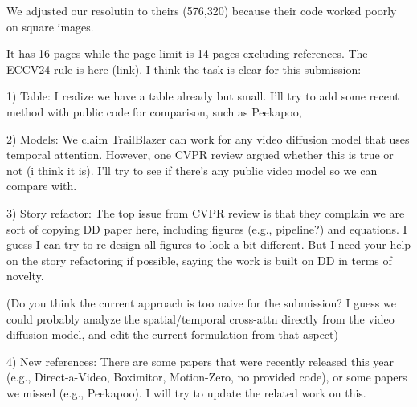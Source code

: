 We adjusted our resolutin to theirs (576,320) because their code worked poorly on square images.


It has 16 pages while the page limit is 14 pages excluding references. The ECCV24 rule is here (link). I think the task is clear for this submission:

1) Table:
I realize we have a table already but small. I'll try to add some recent method with public code for comparison, such as Peekapoo, 
 
2) Models: 
We claim TrailBlazer can work for any video diffusion model that uses temporal attention. However, one CVPR review argued whether this is true or not (i think it is). I'll try to see if there's any public video model so we can compare with.

3) Story refactor:
The top issue from CVPR review is that they complain we are sort of copying DD paper here, including figures (e.g., pipeline?) and equations. I guess I can try to re-design all figures to look a bit different. But I need your help on the story refactoring if possible, saying the work is built on DD in terms of novelty.

(Do you think the current approach is too naive for the submission? I guess we could probably analyze the spatial/temporal cross-attn directly from the video diffusion model, and edit the current formulation from that aspect)

4) New references:
There are some papers that were recently released this year (e.g., Direct-a-Video, Boximitor, Motion-Zero, no provided code), or some papers we missed (e.g., Peekapoo). I will try to update the related work on this.

